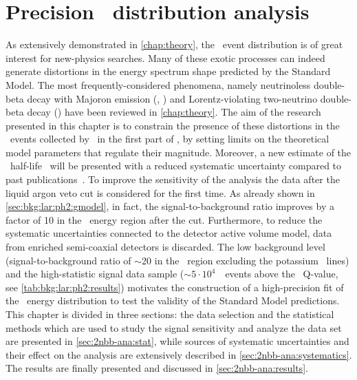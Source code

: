 
\chapter{\texorpdfstring{Precision \nnbb\ distribution analysis}{Precision 2νββ distribution analysis}}%
\label{chap:2nbb-ana}

As extensively demonstrated in \cref{chap:theory}, the \nnbb\ event distribution is of
great interest for new-physics searches. Many of these exotic processes can indeed
generate distortions in the energy spectrum shape predicted by the Standard Model. The
most frequently-considered phenomena, namely neutrinoless double-beta decay with Majoron
emission (\onbbx, \onbbxx) and Lorentz-violating two-neutrino double-beta decay (\nnbblv)
have been reviewed in \cref{chap:theory}. The aim of the research presented in this
chapter is to constrain the presence of these distortions in the \nnbb\ events collected
by \gerda\ in the first part of \phasetwo, by setting limits on the theoretical model
parameters that regulate their magnitude. Moreover, a new estimate of the \nnbb\ half-life
\thalftwo\ will be presented with a reduced systematic uncertainty compared to past
publications~\cite{Agostini2015a}. To improve the sensitivity of the analysis the data
after the liquid argon veto cut is considered for the first time. As already shown in
\cref{sec:bkg:lar:ph2:gmodel}, in fact, the signal-to-background ratio improves by a factor of 10
in the \nnbb\ energy region after the cut. Furthermore, to reduce the systematic
uncertainties connected to the detector active volume model, data from enriched
semi-coaxial detectors is discarded. The low background level (signal-to-background ratio
of $\sim$20 in the \nnbb\ region excluding the potassium \g\ lines) and the high-statistic
signal data sample ($\sim$$5 \cdot 10^{4}$~\nnbb\ events above the \Arl\ Q-value,
see \cref{tab:bkg:lar:ph2:results}) motivates the construction of a high-precision fit
of the \nnbb\ energy distribution to test the validity of the Standard Model predictions.
\newpar
This chapter is divided in three sections: the data selection and the statistical methods
which are used to study the signal sensitivity and analyze the data set are presented in
\cref{sec:2nbb-ana:stat}, while sources of systematic uncertainties and their effect on
the analysis are extensively described in \cref{sec:2nbb-ana:systematics}. The
results are finally presented and discussed in \cref{sec:2nbb-ana:results}.

